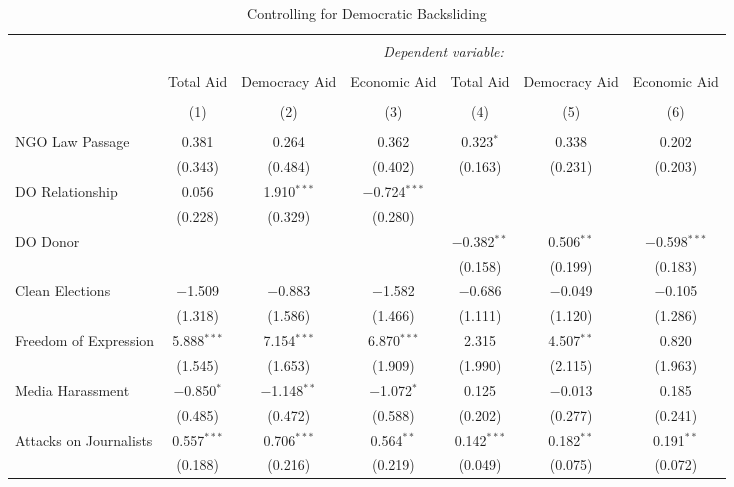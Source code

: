 
\begin{table}[!htbp] \centering 
  \caption{Controlling for Democratic Backsliding} 
  \label{tab:dem_bck} 
\scriptsize 
\begin{tabular}{@{\extracolsep{5pt}}lcccccc} 
\\[-1.8ex]\hline 
\hline \\[-1.8ex] 
 & \multicolumn{6}{c}{\textit{Dependent variable:}} \\ 
\cline{2-7} 
\\[-1.8ex] & Total Aid & Democracy Aid & Economic Aid & Total Aid & Democracy Aid & Economic Aid \\ 
\\[-1.8ex] & (1) & (2) & (3) & (4) & (5) & (6)\\ 
\hline \\[-1.8ex] 
 NGO Law Passage & 0.381 & 0.264 & 0.362 & 0.323$^{*}$ & 0.338 & 0.202 \\ 
  & (0.343) & (0.484) & (0.402) & (0.163) & (0.231) & (0.203) \\ 
  DO Relationship & 0.056 & 1.910$^{***}$ & $-$0.724$^{***}$ &  &  &  \\ 
  & (0.228) & (0.329) & (0.280) &  &  &  \\ 
  DO Donor &  &  &  & $-$0.382$^{**}$ & 0.506$^{**}$ & $-$0.598$^{***}$ \\ 
  &  &  &  & (0.158) & (0.199) & (0.183) \\ 
  Clean Elections & $-$1.509 & $-$0.883 & $-$1.582 & $-$0.686 & $-$0.049 & $-$0.105 \\ 
  & (1.318) & (1.586) & (1.466) & (1.111) & (1.120) & (1.286) \\ 
  Freedom of Expression & 5.888$^{***}$ & 7.154$^{***}$ & 6.870$^{***}$ & 2.315 & 4.507$^{**}$ & 0.820 \\ 
  & (1.545) & (1.653) & (1.909) & (1.990) & (2.115) & (1.963) \\ 
  Media Harassment & $-$0.850$^{*}$ & $-$1.148$^{**}$ & $-$1.072$^{*}$ & 0.125 & $-$0.013 & 0.185 \\ 
  & (0.485) & (0.472) & (0.588) & (0.202) & (0.277) & (0.241) \\ 
  Attacks on Journalists & 0.557$^{***}$ & 0.706$^{***}$ & 0.564$^{**}$ & 0.142$^{***}$ & 0.182$^{**}$ & 0.191$^{**}$ \\ 
  & (0.188) & (0.216) & (0.219) & (0.049) & (0.075) & (0.072) \\ 

\end{tabular}
\end{table}
